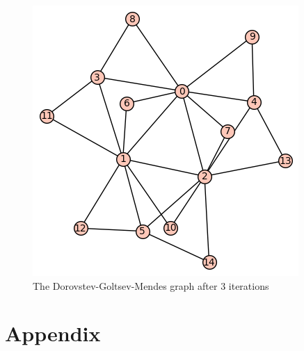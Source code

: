 \documentclass[paper=a4, fontsize=11pt]{scrartcl} %
\begin{document}
\begin{figure}[htbp]
   \centering
   \includegraphics{dgm} %
   \caption{The Dorovstev-Goltsev-Mendes graph after $3$ iterations}
   \label{dgm}
\end{figure}


\section{Appendix}
\end{document}
